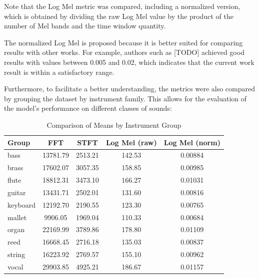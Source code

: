 \documentclass[sigconf,natbib=false]{acmart}
\begin{document}
Note that the Log Mel metric was compared, including a normalized version, which is obtained by dividing the raw Log Mel value by the product of the number of Mel bands and the time window quantity.

The normalized Log Mel is proposed because it is better suited for comparing results with other works. For example, authors such as [TODO] achieved good results with values between 0.005 and 0.02, which indicates that the current work result is within a satisfactory range.

Furthermore, to facilitate a better understanding, the metrics were also compared by grouping the dataset by instrument family. This allows for the evaluation of the model's performance on different classes of sounds:

\begin{table}
  \caption{Comparison of Means by Instrument Group}
  \label{tab:means_by_group}
  \begin{tabular}{lcccc}
    \toprule
    Group & FFT & STFT & Log Mel (raw) & Log Mel (norm) \\
    \midrule
    bass     & 13781.79 & 2513.21 & 142.53 & 0.00884 \\
    brass    & 17602.07 & 3057.35 & 158.85 & 0.00985 \\
    flute    & 18812.31 & 3473.10 & 166.27 & 0.01031 \\
    guitar   & 13431.71 & 2502.01 & 131.60 & 0.00816 \\
    keyboard & 12192.70 & 2190.55 & 123.30 & 0.00765 \\
    mallet   & 9906.05  & 1969.04 & 110.33 & 0.00684 \\
    organ    & 22169.99 & 3789.86 & 178.80 & 0.01109 \\
    reed     & 16668.45 & 2716.18 & 135.03 & 0.00837 \\
    string   & 16223.92 & 2769.57 & 155.10 & 0.00962 \\
    vocal    & 29903.85 & 4925.21 & 186.67 & 0.01157 \\
    \bottomrule
  \end{tabular}
\end{table}
\end{document}

